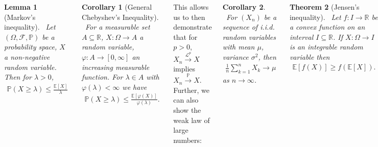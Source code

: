\documentclass{tikzposter} %
\newtheorem{theorem}{Theorem}
\newtheorem{lemma}[theorem]{Lemma}
\newtheorem{corollary}{Corollary}
\begin{document}
\begin{columns}
{    \begin{lemma}[Markov's inequality]
    \ Let $(\Omega, \mathcal{F}, \mathbb{P})$ be a probability space, $X$ a non-negative random variable. Then for $\lambda > 0$,
    \begin{align*}
      \mathbb{P}(X \ge \lambda) \le \frac{\mathbb{E}[X]}{\lambda}
    \end{align*}
    \end{lemma}
    \hphantom{}

    \begin{corollary}[General Chebyshev's Inequality]
    \ For a measurable set $A \subseteq \mathbb{R}$, $X : \Omega \to A$ a random variable, $\varphi : A \to [0,\infty]$ an increasing measurable function. For $\lambda \in A$ with $\varphi(\lambda) < \infty$ we have
    \begin{align*}
      \mathbb{P}(X \ge \lambda) \le \frac{\mathbb{E}[\varphi(X)]}{\varphi(\lambda)}.
    \end{align*}
    \end{corollary}
    \hphantom{}

    This allows us to then demonstrate that for $p > 0$, $X_{n} \overset{\mathcal{L}^{p}}{\to} X$ implies $X_{n} \overset{\mathbb{P}}{\to} X$. \\

    Further, we can also show the weak law of large numbers:
    \begin{corollary}
    \ For $(X_{n})$ be a sequence of i.i.d. random variables with mean $\mu$, variance $\sigma^{2}$, then
    \begin{align*}
      \frac{1}{n}\sum_{k=1}^{n} X_{k} \to \mu
    \end{align*}
    as $n \to \infty$.
    \end{corollary}
    \hphantom{}

    \begin{theorem}[Jensen's inequality]
      \ Let $f : I \to \mathbb{R}$ be a convex function on an interval $I \subseteq \mathbb{R}$. If $X : \Omega \to I$ is an integrable random variable then
      \begin{align*}
        \mathbb{E}[f(X)] \ge f(\mathbb{E}[X]).
      \end{align*}
    \end{theorem}
    \hphantom{}

    For considering the $\mathcal{L}^{p}$ spaces, we define $\Vert \cdot \Vert_{p} := \left(\mathbb{E}[|X|^{p}]\right)^{1/p}$. We can note immediately that for $0 \le p \le q$, $\mathcal{L}^{q} \subseteq \mathcal{L}^{p}$. \\

}
\end{columns}
\end{document}
